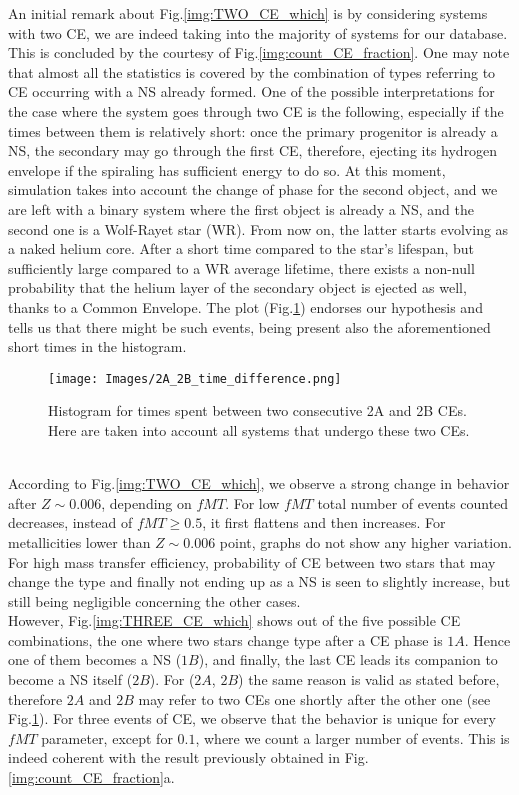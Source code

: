 \documentclass[preprint,12pt]{elsarticle}
\begin{document}
An initial remark about Fig.\ref{img:TWO_CE_which} is by considering systems with two CE, we are indeed taking into the majority of systems for our database. This is concluded by the courtesy of Fig.\ref{img:count_CE_fraction}. One may note that almost all the statistics is covered by the combination of types referring to CE occurring with a NS already formed. One of the possible interpretations for the case where the system goes through two CE is the following, especially if the times between them is relatively short: once the primary progenitor is already a NS, the secondary may go through the first CE, therefore, ejecting its hydrogen envelope if the spiraling has sufficient energy to do so. At this moment, simulation takes into account the change of phase for the second object, and we are left with a binary system where the first object is already a NS, and the second one is a Wolf-Rayet star (WR). From now on, the latter starts evolving as a naked helium core. After a short time compared to the star's lifespan, but sufficiently large compared to a WR average lifetime, there exists a non-null probability that the helium layer of the secondary object is ejected as well, thanks to a Common Envelope. The plot (Fig.\ref{img:diff_time_2A_2B}) endorses our hypothesis and tells us that there might be such events, being present also the aforementioned short times in the histogram.

\begin{figure}[h!]
    \centering
    \texttt{[image: Images/2A\_2B\_time\_difference.png]}
    \caption{Histogram for times spent between two consecutive 2A and 2B CEs. Here are taken into account all systems that undergo these two CEs.}
    \label{img:diff_time_2A_2B}
\end{figure}
\\

According to Fig.\ref{img:TWO_CE_which}, we observe a strong change in behavior after $Z \sim 0.006$, depending on $fMT$. For low $fMT$ total number of events counted decreases, instead of $fMT \geqslant 0.5$, it first flattens and then increases. For metallicities lower than $Z \sim 0.006$ point, graphs do not show any higher variation. For high mass transfer efficiency, probability of CE between two stars that may change the type and finally not ending up as a NS is seen to slightly increase, but still being negligible concerning the other cases.\\
However, Fig.\ref{img:THREE_CE_which} shows out of the five possible CE combinations, the one where two stars change type after a CE phase is $1A$. Hence one of them becomes a NS ($1B$), and finally, the last CE leads its companion to become a NS itself ($2B$). For ($2A$, $2B$) the same reason is valid as stated before, therefore $2A$ and $2B$ may refer to two CEs one shortly after the other one (see Fig.\ref{img:diff_time_2A_2B}). For three events of CE, we observe that the behavior is unique for every $fMT$ parameter, except for $0.1$, where we count a larger number of events. This is indeed coherent with the result previously obtained in Fig.\ref{img:count_CE_fraction}a.\\ 
\end{document}
